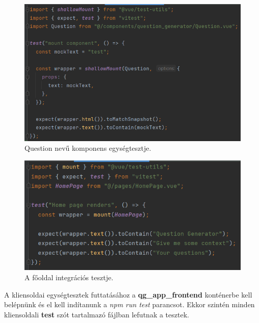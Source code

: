 \begin{figure}[h]
\centering
\includegraphics[scale=0.6]{images/test_frontend_1.png}
\caption{Question nevű komponens egységtesztje.}
\label{fig:tf1}
\end{figure}

\begin{figure}[h]
\centering
\includegraphics[scale=0.6]{images/test_frontend_2.png}
\caption{A főoldal integrációs tesztje.}
\label{fig:tf2}
\end{figure}

A kliensoldai egységtesztek futtatásához a \textbf{qg\_app\_frontend} konténerbe kell belépnünk és el kell indítanunk a \textit{npm run test} parancsot. Ekkor szintén minden kliensoldali \textbf{test} szót tartalmazó fájlban lefutnak a tesztek.

\pagebreak

